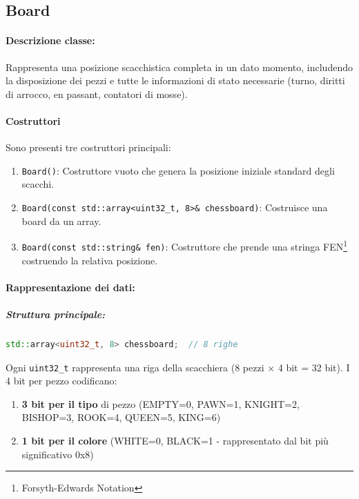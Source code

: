 \subsection{Board}
\paragraph{Descrizione classe:}
Rappresenta una posizione scacchistica completa in un dato momento, includendo la disposizione dei pezzi
e tutte le informazioni di stato necessarie (turno, diritti di arrocco, en passant, contatori di mosse).

\paragraph{Costruttori}
Sono presenti tre costruttori principali:

\begin{enumerate}
  \item \texttt{Board()}: Costruttore vuoto che genera la posizione iniziale standard degli scacchi.
  \item \texttt{Board(const std::array<uint32\_t, 8>\& chessboard)}: Costruisce una board da un array.
  \item \texttt{Board(const std::string\& fen)}: Costruttore che prende una stringa FEN\footnote{Forsyth-Edwards Notation}
        costruendo la relativa posizione.
\end{enumerate}

\paragraph{Rappresentazione dei dati:}

\subparagraph{Struttura principale:}
\begin{lstlisting}[language=C++]
std::array<uint32_t, 8> chessboard;  // 8 righe
\end{lstlisting}

Ogni \texttt{uint32\_t} rappresenta una riga della scacchiera (8 pezzi × 4 bit = 32 bit).
I 4 bit per pezzo codificano:

\begin{enumerate}
  \item \textbf{3 bit per il tipo} di pezzo (EMPTY=0, PAWN=1, KNIGHT=2, BISHOP=3, ROOK=4, QUEEN=5, KING=6)
  \item \textbf{1 bit per il colore} (WHITE=0, BLACK=1 - rappresentato dal bit più significativo 0x8)
\end{enumerate}

